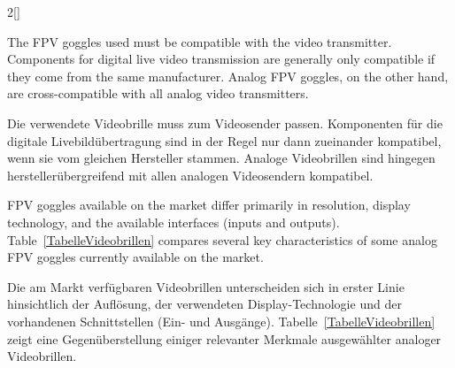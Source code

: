 \begin{paracol}{2}[]
\colende

\renewcommand{\deutschertitel}{Videobrille (FPV-Brille)}
\renewcommand{\englischertitel}{FPV Goggles}
\makroabschnitt
\label{AbschnittFPVBrille}

The FPV goggles used must be compatible with the video transmitter. Components for digital live video transmission are generally only compatible if they come from the same manufacturer. Analog FPV goggles, on the other hand, are cross-compatible with all analog video transmitters.

\colger

Die verwendete Videobrille muss zum Videosender passen. Komponenten für die digitale Livebildübertragung sind in der Regel nur dann zueinander kompatibel, wenn sie vom gleichen Hersteller stammen. Analoge Videobrillen sind hingegen herstellerübergreifend mit allen analogen Videosendern kompatibel.

\coleng

FPV goggles available on the market differ primarily in resolution, display technology, and the available interfaces (inputs and outputs). Table~\ref{TabelleVideobrillen} compares several key characteristics of some analog FPV goggles currently available on the market.

\colger

Die am Markt verfügbaren Videobrillen unterscheiden sich in erster Linie hinsichtlich der Auflösung, der verwendeten Display-Technologie und der vorhandenen Schnittstellen (Ein- und Ausgänge). Tabelle~\ref{TabelleVideobrillen} zeigt eine Gegenüberstellung einiger relevanter Merkmale ausgewählter analoger Videobrillen.

\colende


\end{paracol}

